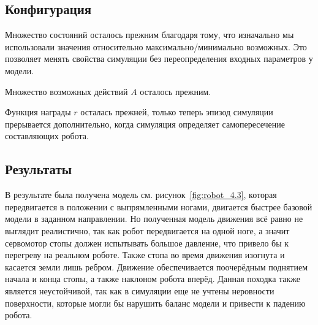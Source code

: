 \subsection{Конфигурация}\label{sec:ch3.1/sec5}

Множество состояний осталось прежним благодаря тому, что изначально мы использовали значения относительно максимально/минимально возможных. Это позволяет менять свойства симуляции без переопределения входных параметров у модели.

Множество возможных действий $A$ осталось прежним.

Функция награды $r$ осталась прежней, только теперь эпизод симуляции прерывается дополнительно, когда симуляция определяет самопересечение составляющих робота.

\subsection{Результаты}\label{sec:ch3.2/sec5}

В результате была получена модель см. рисунок~\cref{fig:robot_4.3}, которая передвигается в положении с выпрямленными ногами, двигается быстрее базовой модели в заданном направлении. Но полученная модель движения всё равно не выглядит реалистично, так как робот передвигается на одной ноге, а значит сервомотор стопы должен испытывать большое давление, что привело бы к перегреву на реальном роботе. Также стопа во время движения изогнута и касается земли лишь ребром. Движение обеспечивается поочерёдным поднятием начала и конца стопы, а также наклоном робота вперёд. Данная походка также является неустойчивой, так как в симуляции еще не учтены неровности поверхности, которые могли бы нарушить баланс модели и привести к падению робота.

